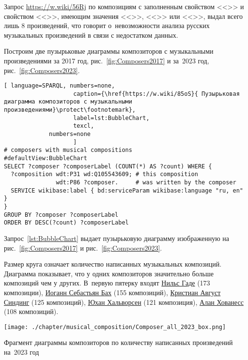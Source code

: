Запрос \href{https://w.wiki/56Rj}{https://w.wiki/56Rj} по композициям с заполненным свойством <<>> и свойством <<>>, имеющим значения <<>>, <<>> или <<>>, выдал всего лишь \num{8} произведений, что говорит о~невозможности анализа русских музыкальных произведений в связи с недостатком данных.

Построим  две пузырьковые диаграммы композиторов с музыкальными произведениями за 2017 год, рис.~\ref{fig:Composers2017} и за~2023 год, рис.~\ref{fig:Composers2023}.

\begin{lstlisting}[ language=SPARQL, numbers=none,
                    caption={\href{https://w.wiki/85oS}{ Пузырьковая диаграмма композиторов с музыкальными произведениями}\protect\footnotemark},
                    label=lst:BubbleChart,
                    texcl,
	         numbers=none
                    ]
# composers with musical compositions
#defaultView:BubbleChart
SELECT ?composer ?composerLabel (COUNT(*) AS ?count) WHERE {
  ?composition wdt:P31 wd:Q105543609; # this composition
               wdt:P86 ?composer.     # was written by the composer
  SERVICE wikibase:label { bd:serviceParam wikibase:language "ru, en" }
}
GROUP BY ?composer ?composerLabel
ORDER BY DESC(?count) ?composerLabel
\end{lstlisting}%


Запрос~\ref{lst:BubbleChart} выдает пузырьковую диаграмму изображенную на рис.~\ref{fig:Composers2017} и рис.~\ref{fig:Composers2023}.

Размер круга означает количество написанных музыкальных композиций. Диаграмма показывает, что у одних композиторов значительно больше композиций чем у других. В~первую пятерку входят \href{https://ru.wikipedia.org/wiki/Гаде,_Нильс}{Нильс Гаде} (\num{173} композиции), \href{https://ru.wikipedia.org/wiki/Бах,_Иоганн_Себастьян}{Иоганн Себастьян Бах} (\num{155} композиций), \href{https://ru.wikipedia.org/wiki/Синдинг,_Кристиан_Август}{Кристиан Август Синдинг} (\num{125} композиций), \href{https://ru.wikipedia.org/wiki/Хальворсен,_Юхан}{Юхан Хальворсен} (\num{121} композиция), \href{https://ru.wikipedia.org/wiki/Хованесс,_Алан}{Алан Хованесс} (\num{108} композиций).

%
%
\begin{marginfigure}
  \texttt{[image: ./chapter/musical\_composition/Composer\_all\_2023\_box.png]}
  \vspace{-7pt}
  \caption[Пузырьковая диаграмма композиторов по количеству написанных композиций на~2023 год]
    {Фрагмент диаграммы композиторов по количеству написанных произведений на~2023 год}%
  \label{fig:Composers2023}%
\end{marginfigure}

